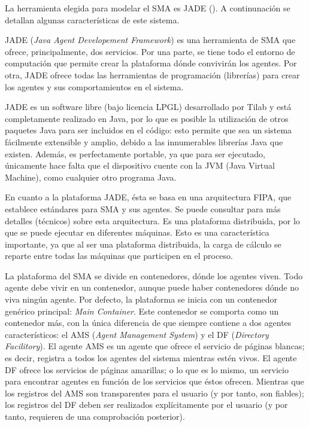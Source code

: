 La herramienta elegida para modelar el SMA es JADE (\cite{jade}). A continunación se detallan algunas características de este sistema. 

JADE (\emph{Java Agent Developement Framework}) es una herramienta de SMA que ofrece, principalmente, dos servicios. Por una parte, se tiene todo el entorno de computación que permite crear la plataforma dónde convivirán los agentes. Por otra, JADE ofrece todas las herramientas de programación (librerías) para crear los agentes y sus comportamientos en el sistema.

JADE es un software libre (bajo licencia LPGL) desarrollado por Tilab y está completamente realizado en Java, por lo que es posible la utilización de otros paquetes Java para ser incluidos en el código: esto permite que sea un sistema fácilmente extensible y amplio, debido a las innumerables librerías Java que existen. Además, es perfectamente portable, ya que para ser ejecutado, únicamente hace falta que el dispositivo cuente con la JVM (Java Virtual Machine), como cualquier otro programa Java.

En cuanto a la plataforma JADE, ésta se basa en una arquitectura FIPA, que establece estándares para SMA y sus agentes. Se puede consultar \cite{fipa} para más detalles (técnicos) sobre esta arquitectura. Es una plataforma distribuida, por lo que se puede ejecutar en diferentes máquinas. Esto es una característica importante, ya que al ser una plataforma distribuida, la carga de cálculo se reparte entre todas las máquinas que participen en el proceso.

La plataforma del SMA se divide en contenedores, dónde los agentes viven. Todo agente debe vivir en un contenedor, aunque puede haber contenedores dónde no viva ningún agente. Por defecto, la plataforma se inicia con un contenedor genérico principal: \emph{Main Container}. Este contenedor se comporta como un contenedor más, con la única diferencia de que siempre contiene a dos agentes característicos: el AMS (\emph{Agent Management System}) y el DF (\emph{Directory Facilitory}). El agente AMS es un agente que ofrece el servicio de páginas blancas; es decir, registra a todos los agentes del sistema mientras estén vivos. El agente DF ofrece los servicios de páginas amarillas; o lo que es lo mismo, un servicio para encontrar agentes en función de los servicios que éstos ofrecen. Mientras que los registros del AMS son transparentes para el usuario (y por tanto, son fiables); los registros del DF deben ser realizados explícitamente por el usuario (y por tanto, requieren de una comprobación posterior).

